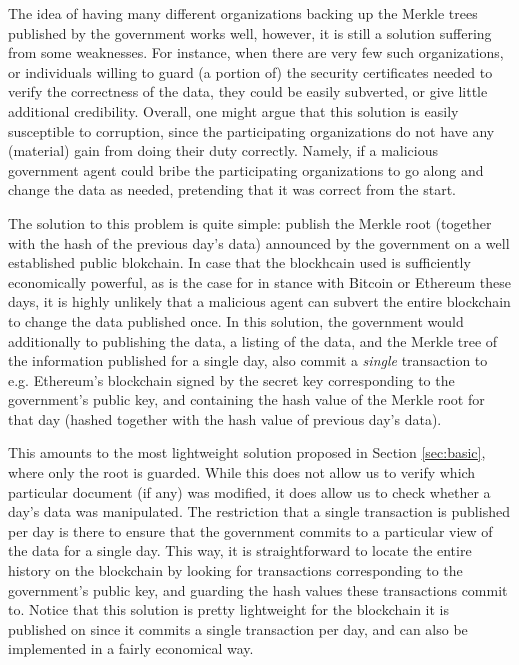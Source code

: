 

The idea of having many different organizations backing up the Merkle trees published by the government works well, however, it is still a solution suffering from some weaknesses. For instance, when there are very few such organizations, or individuals willing to guard (a portion of) the security certificates needed to verify the correctness of the data, they could be easily subverted, or give little additional credibility. Overall, one might argue that this solution is easily susceptible to corruption, since the participating organizations do not have any (material) gain from doing their duty correctly. Namely, if a malicious government agent could bribe the participating organizations to go along and change the data as needed, pretending that it was correct from the start. %


The solution to this problem is quite simple: publish the Merkle root (together with the hash of the previous day's data) announced by the government on a well established public blokchain. In case that the blockhcain used is sufficiently economically powerful, as is the case for in stance with Bitcoin or Ethereum these days, it is highly unlikely that a malicious agent can subvert the entire blockchain to change the data published once. In this solution, the government would additionally to publishing the data, a listing of the data, and the Merkle tree of the information published for a single day, also commit a {\em single} transaction to e.g. Ethereum's blockchain signed by the secret key corresponding to the government's public key, and containing the hash value of the Merkle root for that day (hashed together with the hash value of previous day's data).

This amounts to the most lightweight solution proposed in Section \ref{sec:basic}, where only the root is guarded. While this does not allow us to verify which particular document (if any) was modified, it does allow us to check whether a day's data was manipulated. The restriction that a single transaction is published per day is there to ensure that  the government commits to a particular view of the data for a single day. This way, it is straightforward to locate the entire history on the blockchain by looking for transactions corresponding to the government's public key, and guarding the hash values these transactions commit to. Notice that this solution is pretty lightweight for the blockchain it is published on since it commits a single transaction per day, and can also be implemented in a fairly economical way.



